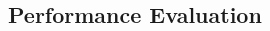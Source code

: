 \documentclass{beamer}
\begin{document}
\begin{CJK}{UTF8}{bkai}



            \section{Performance Evaluation}

\end{CJK}
\end{document}
